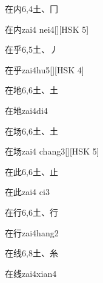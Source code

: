 \begin{Entry}{在内}{6,4}{⼟、⼌}
  \begin{Phonetics}{在内}{zai4 nei4}[][HSK 5]
  \end{Phonetics}
\end{Entry}

\begin{Entry}{在乎}{6,5}{⼟、⼃}
  \begin{Phonetics}{在乎}{zai4hu5}[][HSK 4]
  \end{Phonetics}
\end{Entry}

\begin{Entry}{在地}{6,6}{⼟、⼟}
  \begin{Phonetics}{在地}{zai4di4}
  \end{Phonetics}
\end{Entry}

\begin{Entry}{在场}{6,6}{⼟、⼟}
  \begin{Phonetics}{在场}{zai4 chang3}[][HSK 5]
  \end{Phonetics}
\end{Entry}

\begin{Entry}{在此}{6,6}{⼟、⽌}
  \begin{Phonetics}{在此}{zai4 ci3}
  \end{Phonetics}
\end{Entry}

\begin{Entry}{在行}{6,6}{⼟、⾏}
  \begin{Phonetics}{在行}{zai4hang2}
  \end{Phonetics}
\end{Entry}

\begin{Entry}{在线}{6,8}{⼟、⽷}
  \begin{Phonetics}{在线}{zai4xian4}
  \end{Phonetics}
\end{Entry}

